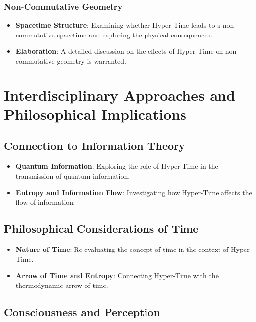 \documentclass[11pt,a4paper]{article}
\begin{document}
\subsubsection{Non-Commutative Geometry}

\begin{itemize}
    \item \textbf{Spacetime Structure}: Examining whether Hyper-Time leads to a non-commutative spacetime and exploring the physical consequences.
    \item \textbf{Elaboration}: A detailed discussion on the effects of Hyper-Time on non-commutative geometry is warranted.
\end{itemize}

\section{Interdisciplinary Approaches and Philosophical Implications}

\subsection{Connection to Information Theory}

\begin{itemize}
    \item \textbf{Quantum Information}: Exploring the role of Hyper-Time in the transmission of quantum information.
    \item \textbf{Entropy and Information Flow}: Investigating how Hyper-Time affects the flow of information.
\end{itemize}

\subsection{Philosophical Considerations of Time}

\begin{itemize}
    \item \textbf{Nature of Time}: Re-evaluating the concept of time in the context of Hyper-Time.
    \item \textbf{Arrow of Time and Entropy}: Connecting Hyper-Time with the thermodynamic arrow of time.
\end{itemize}

\subsection{Consciousness and Perception}
\end{document}
